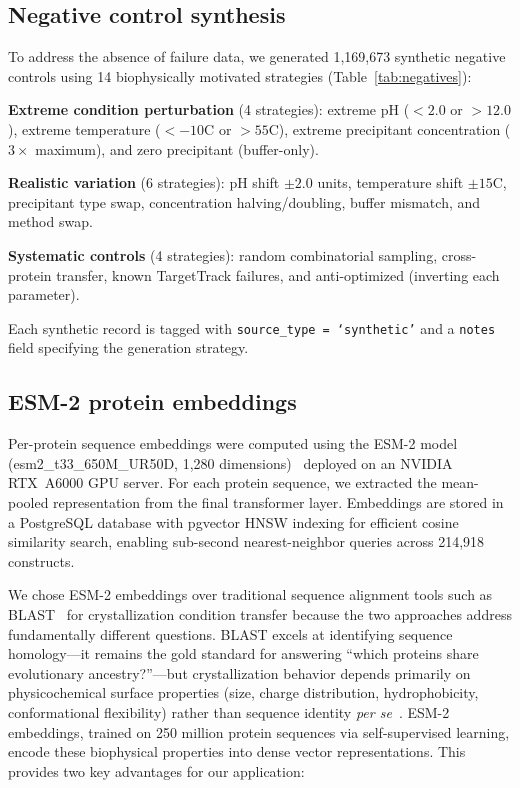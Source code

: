 \documentclass[11pt]{article}
\begin{document}
\subsection*{Negative control synthesis}

To address the absence of failure data, we generated 1,169,673 synthetic negative controls using 14 biophysically motivated strategies (Table~\ref{tab:negatives}):

\textbf{Extreme condition perturbation} (4 strategies): extreme pH ($<2.0$ or $>12.0$), extreme temperature ($<-10$\textdegree C or $>55$\textdegree C), extreme precipitant concentration ($3\times$ maximum), and zero precipitant (buffer-only).

\textbf{Realistic variation} (6 strategies): pH shift $\pm2.0$ units, temperature shift $\pm15$\textdegree C, precipitant type swap, concentration halving/doubling, buffer mismatch, and method swap.

\textbf{Systematic controls} (4 strategies): random combinatorial sampling, cross-protein transfer, known TargetTrack failures, and anti-optimized (inverting each parameter).

Each synthetic record is tagged with \texttt{source\_type = `synthetic'} and a \texttt{notes} field specifying the generation strategy.

\subsection*{ESM-2 protein embeddings}

Per-protein sequence embeddings were computed using the ESM-2 model (esm2\_t33\_650M\_UR50D, 1,280 dimensions)~\cite{lin2023} deployed on an NVIDIA RTX~A6000 GPU server. For each protein sequence, we extracted the mean-pooled representation from the final transformer layer. Embeddings are stored in a PostgreSQL database with pgvector HNSW indexing for efficient cosine similarity search, enabling sub-second nearest-neighbor queries across 214,918 constructs.

We chose ESM-2 embeddings over traditional sequence alignment tools such as BLAST~\cite{altschul1990} for crystallization condition transfer because the two approaches address fundamentally different questions. BLAST excels at identifying sequence homology---it remains the gold standard for answering ``which proteins share evolutionary ancestry?''---but crystallization behavior depends primarily on physicochemical surface properties (size, charge distribution, hydrophobicity, conformational flexibility) rather than sequence identity \emph{per se}~\cite{rupp2009}. ESM-2 embeddings, trained on 250 million protein sequences via self-supervised learning, encode these biophysical properties into dense vector representations. This provides two key advantages for our application:
\end{document}
